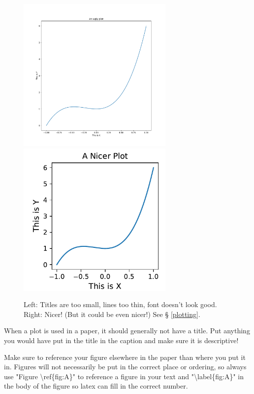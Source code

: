 \documentclass[12pt,preprint]{aastex}
\begin{document}




\begin{figure}[htb]
\begin{center} 
\includegraphics[width=3in]{simple.pdf}
\includegraphics[width=3in]{nicer.pdf}
\end{center}
\caption{Left: Titles are too small, lines too thin, font doesn't look
good. Right: Nicer! (But it could be even nicer!) See \S
\ref{plotting}.  \label{simple}}
\end{figure}

When a plot is used in a paper, it should generally not have a title. Put anything you would have put in the title in the caption and make sure it is descriptive!

Make sure to reference your figure elsewhere in the paper than where you put it in. Figures will not necessarily be put in the correct place or ordering, so always use "Figure \textbackslash ref\{fig:A\}" to reference a figure in your text and "\textbackslash label\{fig:A\}" in the body of the figure so latex can fill in the correct number.
\end{document}
